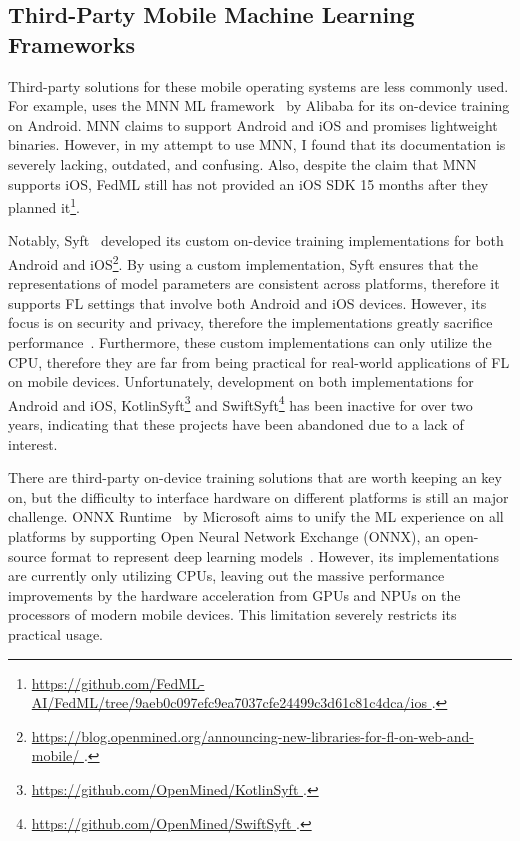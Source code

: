 \documentclass[conference]{IEEEtran}
\begin{document}
\subsection{Third-Party Mobile Machine Learning Frameworks}

Third-party solutions for these mobile operating systems are less commonly used.
For example, \FedML{} uses
the MNN ML framework~\cite{jiang2020mnn,lv2022walle} by Alibaba for
its on-device training on Android.
MNN claims to support Android and iOS and promises lightweight binaries.
However, in my attempt to use MNN, I found that its documentation is
severely lacking, outdated, and confusing.
Also, despite the claim that MNN supports iOS,
FedML still has not provided an iOS SDK 15 months after they planned
it\footnote{\url{
    https://github.com/FedML-AI/FedML/tree/9aeb0c097efc9ea7037cfe24499c3d61c81c4dca/ios
}.}.

Notably, Syft~\cite{ryffel2018generic,Ziller2021,hall2021syft} developed
its custom on-device training implementations for
both Android and iOS\footnote{\url{
    https://blog.openmined.org/announcing-new-libraries-for-fl-on-web-and-mobile/
}.}.
By using a custom implementation,
Syft ensures that the representations of model parameters are
consistent across platforms,
therefore it supports FL settings that involve both Android and iOS devices.
However, its focus is on security and privacy,
therefore the implementations greatly sacrifice
performance~\cite{ryffel2018generic}.
Furthermore, these custom implementations can only utilize the CPU,
therefore they are far from being practical for real-world applications of
FL on mobile devices.
Unfortunately, development on
both implementations for Android and iOS,
KotlinSyft\footnote{\url{
    https://github.com/OpenMined/KotlinSyft
}.} and SwiftSyft\footnote{\url{
    https://github.com/OpenMined/SwiftSyft
}.} has been inactive for over two years,
indicating that these projects have been abandoned due to a lack of interest.

There are third-party on-device training solutions that are worth keeping an key on,
but the difficulty to interface hardware on different platforms is
still an major challenge.
ONNX Runtime~\cite{onnxruntime} by Microsoft aims to
unify the ML experience on all platforms by
supporting Open Neural Network Exchange (ONNX),
an open-source format to represent deep learning
models~\cite{ParedesdelRio2020}.
However, its implementations are currently only utilizing CPUs,
leaving out the massive performance improvements by the hardware acceleration
from GPUs and NPUs on the processors of modern mobile devices.
This limitation severely restricts its practical usage.
\end{document}
